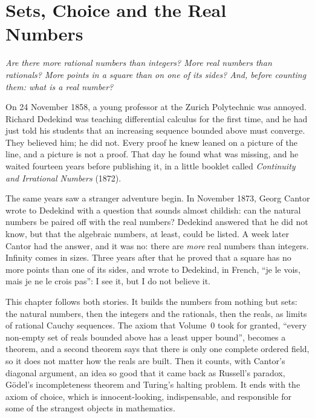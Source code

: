 \chapter{Sets, Choice and the Real Numbers}

\begin{center}\itshape
Are there more rational numbers than integers? More real numbers than rationals? More points in a square
than on one of its sides? And, before counting them: what \emph{is} a real number?
\end{center}

On 24 November 1858, a young professor at the Zurich Polytechnic was annoyed. Richard Dedekind was teaching
differential calculus for the first time, and he had just told his students that an increasing sequence bounded
above must converge. They believed him; he did not. Every proof he knew leaned on a picture of the line, and a
picture is not a proof. That day he found what was missing, and he waited fourteen years before publishing it, in a
little booklet called \emph{Continuity and Irrational Numbers} (1872).

The same years saw a stranger adventure begin. In November 1873, Georg Cantor wrote to Dedekind with a question
that sounds almost childish: can the natural numbers be paired off with the real numbers? Dedekind answered that
he did not know, but that the algebraic numbers, at least, could be listed. A week later Cantor had the answer,
and it was no: there are \emph{more} real numbers than integers. Infinity comes in sizes. Three years after that he
proved that a square has no more points than one of its sides, and wrote to Dedekind, in French, ``je le vois,
mais je ne le crois pas'': I see it, but I do not believe it.

This chapter follows both stories. It builds the numbers from nothing but sets: the natural numbers, then the
integers and the rationals, then the reals, as limits of rational Cauchy sequences. The axiom that Volume~0 took for
granted, ``every non-empty set of reals bounded above has a least upper bound'', becomes a theorem, and a second
theorem says that there is only one complete ordered field, so it does not matter how the reals are built. Then it
counts, with Cantor's diagonal argument, an idea so good that it came back as Russell's paradox, G\"odel's
incompleteness theorem and Turing's halting problem. It ends with the axiom of choice, which is innocent-looking,
indispensable, and responsible for some of the strangest objects in mathematics.

